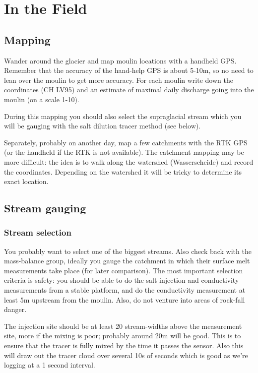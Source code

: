 \documentclass[DIV=15,halfparskip,11pt,headinclude]{scrartcl}
\begin{document}
\section{In the Field}
\subsection{Mapping}
\label{sec-1}

Wander around the glacier and map moulin locations with a handheld
GPS.  Remember that the accuracy of the hand-help GPS is about 5-10m,
so no need to lean over the moulin to get more accuracy.  For each
moulin write down the coordinates (CH LV95) and an estimate of maximal
daily discharge going into the moulin (on a scale 1-10).

During this mapping you should also select the supraglacial stream
which you will be gauging with the salt dilution tracer method (see
below).

Separately, probably on another day, map a few catchments with the
RTK GPS (or the handheld if the RTK is not available).  The
catchment mapping may be more difficult: the idea is to walk along the
watershed (Wasserscheide) and record the coordinates.  Depending on
the watershed it will be tricky to determine its exact location.

\subsection{Stream gauging}
\label{sec-2}

\subsubsection{Stream selection}
\label{sec-2-1}
You probably want to select one of the biggest streams.  Also check
back with the mass-balance group, ideally you gauge the catchment in
which their surface melt measurements take place (for later
comparison).  The most important selection criteria is safety: you
should be able to do the salt injection and conductivity measurements
from a stable platform, and do the conductivity measurement at least
5m upstream from the moulin.  Also, do not venture into areas of
rock-fall danger.


The injection site should be at least 20 stream-widths above the
measurement site, more if the mixing is poor; probably around 20m
will be good.  This is to ensure that the tracer is fully mixed by the
time it passes the sensor.  Also this will draw out the tracer cloud
over several 10s of seconds which is good as we're logging at a 1
second interval.
\end{document}
